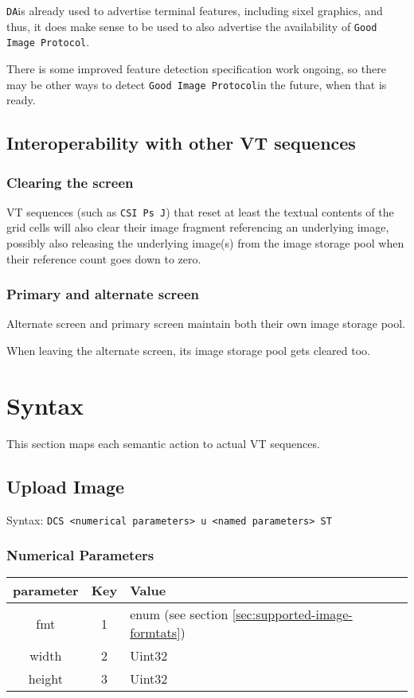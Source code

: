 \documentclass{article}
\newcommand{\code}[1]{\colorbox{light-gray}{\texttt{#1}}}
\newcommand{\DA}{\code{DA}}
\newcommand{\GoodImageProtocol}{\code{Good Image Protocol}}
\begin{document}
\DA is already used to advertise terminal features, including sixel graphics, and thus,
it does make sense to be used to also advertise the availability of \GoodImageProtocol.

There is some improved feature detection specification work ongoing,
so there may be other ways to detect \GoodImageProtocol in the future, when that is ready.

\subsection{Interoperability with other VT sequences}

\subsubsection*{Clearing the screen}

VT sequences (such as \code{CSI Ps J}) that reset at least the textual contents of the grid cells will also
clear their image fragment referencing an underlying image, possibly also releasing the
underlying image(s) from the image storage pool when their reference count goes down to zero.

\subsubsection*{Primary and alternate screen}

Alternate screen and primary screen maintain both their own image storage pool.

When leaving the alternate screen, its image storage pool gets cleared too.
\section{Syntax} %

This section maps each semantic action to actual VT sequences.

\subsection{Upload Image}

Syntax: \code{DCS <numerical parameters> u <named parameters> ST}

\subsubsection*{Numerical Parameters}

\begin{tabular}{ |c|c|l| }
    \hline
    \textbf{parameter}   & \textbf{Key} & \textbf{Value} \\
    \hline
    fmt         & 1   & enum (see section \ref{sec:supported-image-formtats}) \\
    width       & 2   & Uint32 \\
    height      & 3   & Uint32 \\
    \hline
\end{tabular}
\end{document}
